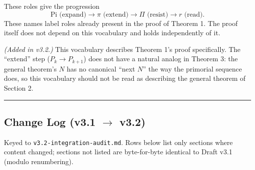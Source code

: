 \documentclass[
]{article}
\begin{document}
These roles give the progression \[
\text{Pi (expand)} \to \pi\text{ (extend)} \to \Pi\text{ (resist)} \to r\text{ (read)}.
\] These names label roles already present in the proof of Theorem 1.
The proof itself does not depend on this vocabulary and holds
independently of it.

\emph{(Added in v3.2.)} This vocabulary describes Theorem 1's proof
specifically. The ``extend'' step (\(P_k\to P_{k+1}\)) does not have a
natural analog in Theorem 3: the general theorem's \(N\) has no
canonical ``next \(N\)'' the way the primorial sequence does, so this
vocabulary should not be read as describing the general theorem of
Section 2.

\begin{center}\rule{0.5\linewidth}{0.5pt}\end{center}

\subsection{\texorpdfstring{Change Log (v3.1 \(\to\) v3.2)}{Change Log (v3.1 -> v3.2)}}\label{change-log-v3.1-v3.2}

Keyed to \texttt{v3.2-integration-audit.md}. Rows below list only
sections where content changed; sections not listed are byte-for-byte
identical to Draft v3.1 (modulo renumbering).
\end{document}
